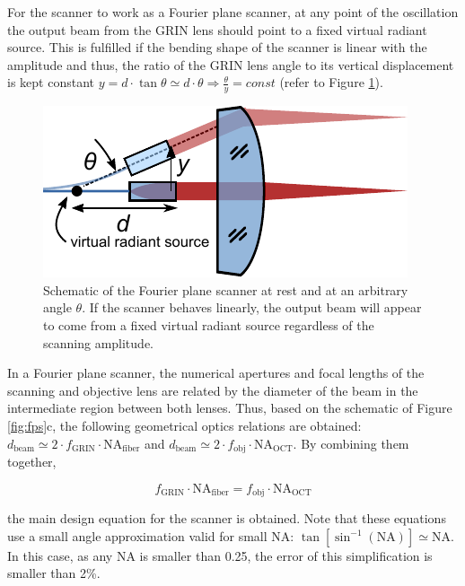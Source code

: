For the scanner to work as a Fourier plane scanner, at any point of the oscillation the output beam from the GRIN lens should point to a fixed virtual radiant source. This is fulfilled if the bending shape of the scanner is linear with the amplitude and thus, the ratio of the GRIN lens angle to its vertical displacement is kept constant $ y = d \cdot \tan \theta \simeq d \cdot \theta \Rightarrow \frac{\theta}{y} = const $ (refer to Figure \ref{fig:radiant}).

\begin{figure}[h!]\centering
      \includegraphics{figures/30_DesignSimulation/Mechanical/radiant.pdf}
      \caption{Schematic of the Fourier plane scanner at rest and at an arbitrary angle $\theta$. If the scanner behaves linearly, the output beam will appear to come from a fixed virtual radiant source regardless of the scanning amplitude.}
      \label{fig:radiant}
\end{figure}


In a Fourier plane scanner, the numerical apertures and focal lengths of the scanning and objective lens are related by the diameter of the beam in the intermediate region between both lenses. Thus, based on the schematic of Figure \ref{fig:fps}c, the following geometrical optics relations are obtained: $d_\mathrm{beam} \simeq 2\cdot f_\mathrm{GRIN}\cdot \mathrm{NA}_\mathrm{fiber}$ and $d_\mathrm{beam} \simeq 2 \cdot f_\mathrm{obj}\cdot \mathrm{NA}_\mathrm{OCT}$. By combining them together,

\begin{equation}
f_\mathrm{GRIN} \cdot \mathrm{NA}_\mathrm{fiber} = f_\mathrm{obj} \cdot \mathrm{NA}_\mathrm{OCT}
\label{eq:fpsNA}
\end{equation}

the main design equation for the scanner is obtained. Note that these equations use a small angle approximation valid for small NA:  $\tan[\sin^{-1}(\mathrm{NA})] \simeq \mathrm{NA} $. In this case, as any NA is smaller than 0.25, the error of this simplification is smaller than 2\%.

